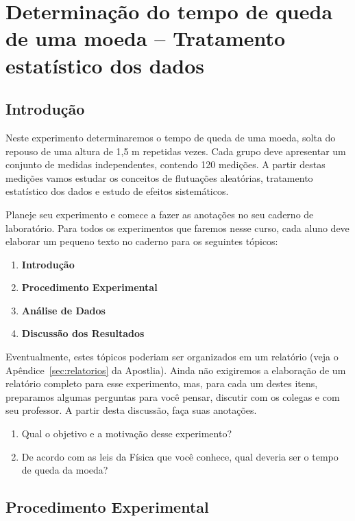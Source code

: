 
\chapter{Determinação do tempo de queda de uma moeda  -- Tratamento estatístico dos dados}
\label{chap:tempoqueda}
\vspace{-0.7cm}

\section{Introdução}

Neste experimento determinaremos o tempo de queda de uma moeda, solta do repouso de uma altura de 1,5 m repetidas vezes. Cada grupo deve apresentar um conjunto de medidas independentes, contendo 120 medições. A partir destas medições vamos estudar os conceitos de flutuações aleatórias, tratamento estatístico dos dados e estudo de efeitos sistemáticos. 

Planeje seu experimento e comece a fazer as anotações no seu caderno de laboratório. Para todos os experimentos que faremos nesse curso, cada aluno deve elaborar um pequeno texto no caderno para os seguintes tópicos: 

\begin{enumerate}
\item {\bf Introdução }
\item {\bf Procedimento Experimental}
\item {\bf Análise de Dados}
\item {\bf Discussão dos Resultados}
\end{enumerate}

Eventualmente, estes tópicos poderiam ser organizados em um relatório (veja o Apêndice~\ref{sec:relatorios} da Apostlia). Ainda não exigiremos a elaboração de um relatório completo para esse experimento, mas, 
para cada um destes itens, preparamos algumas perguntas para você pensar,  discutir com os colegas e com seu professor. A partir desta discussão, faça suas anotações. 

\begin{enumerate}
\item Qual o objetivo e a motivação desse experimento?
\item De acordo com as leis da Física que você conhece, qual deveria ser o tempo de queda da moeda? 
\end{enumerate}


\section{Procedimento Experimental}

